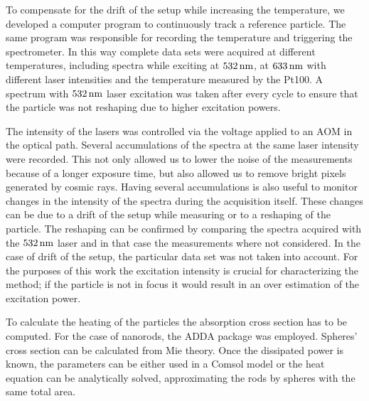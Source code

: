 To compensate for the drift of the setup while increasing the temperature, we
developed a computer program to continuously track a reference particle. The
same program was responsible for recording the temperature and triggering the
spectrometer. In this way complete data sets were acquired at different
temperatures, including spectra while exciting at $532\,\textrm{nm}$, at $633\,\textrm{nm}$ with
different laser intensities and the temperature measured by the Pt100. A
spectrum with $532\,\textrm{nm}$ laser excitation was taken after every cycle to ensure
that the particle was not reshaping due to higher excitation powers.

The intensity of the lasers was controlled via the voltage applied to an AOM in
the optical path. Several accumulations of the spectra at the same laser
intensity were recorded. This not only allowed us to lower the noise of the
measurements because of a longer exposure time, but also allowed us to remove
bright pixels generated by cosmic rays. Having several accumulations is also
useful to monitor changes in the intensity of the spectra during the acquisition
itself. These changes can be due to a drift of the setup while measuring or to a
reshaping of the particle. The reshaping can be confirmed by comparing the
spectra acquired with the $532\,\textrm{nm}$ laser\cite{Liu2009} and in that case the
measurements where not considered. In the case of drift of the setup, the
particular data set was not taken into account. For the purposes of this
work the excitation intensity is crucial for characterizing the method;
if the particle is not in focus it would result in an over estimation of the
excitation power. 

To calculate the heating of the particles the absorption cross section has to be
computed. For the case of nanorods, the ADDA package was
employed\cite{Yurkin2011}. Spheres' cross section can be calculated from Mie
theory. Once the dissipated power is known, the parameters can be either used in
a Comsol model or the heat equation can be analytically solved, approximating
the rods by spheres with the same total area.

